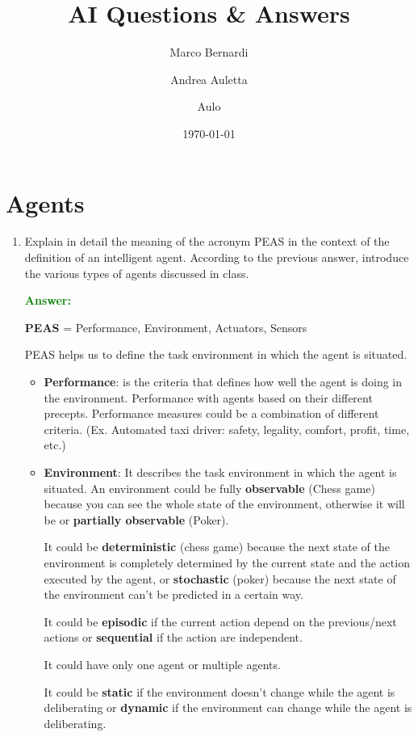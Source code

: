 \documentclass[12pt]{article}
\title{AI Questions \& Answers}
\author{
    Marco Bernardi
    \and
    Andrea Auletta
    \and
    Aulo
}
\date{\today}
\begin{document}
\maketitle
\section{Agents}
\begin{enumerate}[label=\textbf{A.\arabic*}]
    \item Explain in detail the meaning of the acronym PEAS in the context of the definition of an intelligent agent. 
    According to the previous answer, introduce the various types of agents discussed in class.
    
    \textcolor{green}{\textbf{Answer:}}
    
    \textbf{PEAS} = Performance, Environment, Actuators, Sensors

    PEAS helps us to define the task environment in which the agent is situated.
    \begin{itemize}
        \item \textbf{Performance}: is the criteria that defines how well the agent is doing in the environment.
        Performance with agents based on their different precepts.
        Performance measures could be a combination of different criteria. (Ex. Automated taxi driver: safety, legality, comfort, profit, time, etc.) 
        
        \item \textbf{Environment}: It describes the task environment in which the agent is situated.
        An environment could be fully \textbf{observable} (Chess game) because you can see the whole state of the environment, otherwise it will be 
        or \textbf{partially observable} (Poker).

        It could be \textbf{deterministic} (chess game) because the next state of the environment is completely determined 
        by the current state and the action executed by the agent,
        or \textbf{stochastic} (poker) because the next state of the environment can't be predicted in a certain way.

        It could be \textbf{episodic} if the current action depend on the previous/next actions or \textbf{sequential} if the action are independent.
        
        It could have only one agent or multiple agents.

        It could be \textbf{static} if the environment doesn't change while the agent is deliberating or \textbf{dynamic} if the environment can change while the agent is deliberating.


\end{itemize}
\end{enumerate}
\end{document}
